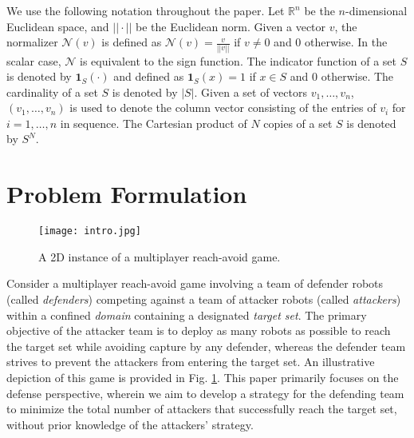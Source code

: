 \documentclass[journal]{IEEEtran}
\newcommand{\R}{\mathbb{R}}
\newcommand{\n}{\mathscr{N}}
\newcommand{\1}{\mathbf{1}}
\begin{document}
We use the following notation throughout the paper. Let $\R^n$ be the $n$-dimensional Euclidean space, and $||\cdot||$ be the Euclidean norm. Given a vector $v$, the normalizer $\n(v)$ is defined as $\n(v)=\frac{v}{||v||}$ if $v\neq 0$ and $0$ otherwise. In the scalar case, $\n$ is equivalent to the sign function. The indicator function of a set $S$ is denoted by $\1_{S}(\cdot)$ and defined as $\1_{S}(x)=1$ if $x\in S$ and $0$ otherwise. The cardinality of a set $S$ is denoted by $|S|$. Given a set of vectors $v_1,\ldots,v_n$, $(v_1,\ldots,v_n)$ is used to denote the column vector consisting of the entries of $v_i$ for $i=1,\ldots,n$ in sequence. The Cartesian product of $N$ copies of a set $S$ is denoted by $S^N$.

\section{Problem Formulation}\label{sec:2}

\begin{figure}[tp!]
	\centering
	\texttt{[image: intro.jpg]}
	\caption{\footnotesize {A 2D instance of a multiplayer reach-avoid game.}}
	\label{fig:radg}
\end{figure}

Consider a multiplayer reach-avoid game involving a team of defender robots (called \textit{defenders}) competing against a team of attacker robots (called \textit{attackers}) within a confined \textit{domain} containing a designated \textit{target set}. The primary objective of the attacker team is to deploy as many robots as possible to reach the target set while avoiding capture by any defender, whereas the defender team strives to prevent the attackers from entering the target set. An illustrative depiction of this game is provided in Fig. \ref{fig:radg}. This paper primarily focuses on the defense perspective, wherein we aim to develop a strategy for the defending team to minimize the total number of attackers that successfully reach the target set, without prior knowledge of the attackers' strategy.
\end{document}

